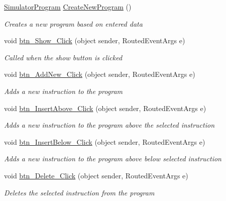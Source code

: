 \begin{DoxyCompactItemize}
\hyperlink{class_c_p_u___o_s___simulator_1_1_c_p_u_1_1_simulator_program}{Simulator\+Program} \hyperlink{class_c_p_u___o_s___simulator_1_1_main_window_a4cb75cfa224757b1dc708b60681ad803}{Create\+New\+Program} ()
\begin{DoxyCompactList}\small\item\em Creates a new program based on entered data \end{DoxyCompactList}\item 
void \hyperlink{class_c_p_u___o_s___simulator_1_1_main_window_afcb6e2b3719374f56fd8cb1c786bb219}{btn\+\_\+\+Show\+\_\+\+Click} (object sender, Routed\+Event\+Args e)
\begin{DoxyCompactList}\small\item\em Called when the show button is clicked \end{DoxyCompactList}\item 
void \hyperlink{class_c_p_u___o_s___simulator_1_1_main_window_a37c97ac2869b40063089f1af9cd86724}{btn\+\_\+\+Add\+New\+\_\+\+Click} (object sender, Routed\+Event\+Args e)
\begin{DoxyCompactList}\small\item\em Adds a new instruction to the program \end{DoxyCompactList}\item 
void \hyperlink{class_c_p_u___o_s___simulator_1_1_main_window_a8f710b1bee7b3c9360fb5652231b0502}{btn\+\_\+\+Insert\+Above\+\_\+\+Click} (object sender, Routed\+Event\+Args e)
\begin{DoxyCompactList}\small\item\em Adds a new instruction to the program above the selected instruction \end{DoxyCompactList}\item 
void \hyperlink{class_c_p_u___o_s___simulator_1_1_main_window_ac2307db4caedc82b5a6201077fb1c5b7}{btn\+\_\+\+Insert\+Below\+\_\+\+Click} (object sender, Routed\+Event\+Args e)
\begin{DoxyCompactList}\small\item\em Adds a new instruction to the program above below selected instruction \end{DoxyCompactList}\item 
void \hyperlink{class_c_p_u___o_s___simulator_1_1_main_window_a96ea1acde80b84701b58c1d4aaed2b9f}{btn\+\_\+\+Delete\+\_\+\+Click} (object sender, Routed\+Event\+Args e)
\begin{DoxyCompactList}\small\item\em Deletes the selected instruction from the program \end{DoxyCompactList}\item 

\end{DoxyCompactItemize}
